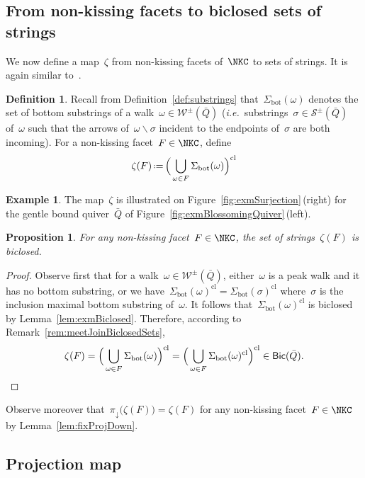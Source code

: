 \documentclass{amsart}
\newtheorem{proposition}[theorem]{Proposition}
\theoremstyle{definition}
\newtheorem{definition}[theorem]{Definition}
\newtheorem{example}[theorem]{Example}
\newcommand{\ssm}{\smallsetminus} %
\newcommand{\eqdef}{\mbox{\,\raisebox{0.2ex}{\scriptsize\ensuremath{\mathrm:}}\ensuremath{=}\,}} %
\newcommand{\fref}[1]{Figure~\ref{#1}} %
\newcommand{\ie}{\textit{i.e.}~} %
\newcommand{\strings}{\mathcal{S}} %
\newcommand{\walks}{\mathcal{W}} %
\newcommand{\bottom}{\mathrm{bot}} %
\newcommand{\closure}[1]{#1^{\mathrm{cl}}} %
\newcommand{\Bicl}[1]{\mathsf{Bic}(#1)} %
\newcommand{\projDown}{\pi_\downarrow} %
\begin{document}
\subsection{From non-kissing facets to biclosed sets of strings}

We now define a map~$\zeta$ from non-kissing facets of~$\NKC$ to sets of strings.
It is again similar to~\cite[Sect.~8]{McConville}.

\begin{definition}
\label{def:zeta}
Recall from Definition~\ref{def:substrings} that~$\Sigma_\bottom(\omega)$ denotes the set of bottom substrings of a walk~$\omega \in \walks^\pm(\bar Q)$ (\ie substrings~$\sigma \in \strings^\pm(\bar Q)$ of~$\omega$ such that the arrows of~$\omega \ssm \sigma$ incident to the endpoints of~$\sigma$ are both incoming).
For a non-kissing facet~$F \in \NKC$, define
\[
\zeta(F) \eqdef \closure{\Big( \bigcup_{\omega \in F} \Sigma_\bottom(\omega) \Big)}
\]
\end{definition}

\begin{example}
The map~$\zeta$ is illustrated on \fref{fig:exmSurjection}\,(right)  for the gentle bound quiver~$\bar Q$ of \fref{fig:exmBlossomingQuiver}\,(left).
\end{example}

\begin{proposition}
For any non-kissing facet~$F \in \NKC$, the set of strings~$\zeta(F)$ is biclosed.
\end{proposition}

\begin{proof}
Observe first that for a walk~$\omega \in \walks^\pm(\bar Q)$, either~$\omega$ is a peak walk and it has no bottom substring, or we have~$\closure{\Sigma_\bottom(\omega)} = \closure{\Sigma_\bottom(\sigma)}$ where~$\sigma$ is the inclusion maximal bottom substring of~$\omega$.
It follows that~$\closure{\Sigma_\bottom(\omega)}$ is biclosed by Lemma~\ref{lem:exmBiclosed}.
Therefore, according to Remark~\ref{rem:meetJoinBiclosedSets},
\[
\zeta(F) = \closure{\Big( \bigcup_{\omega \in F} \Sigma_\bottom(\omega) \Big)} = \closure{\Big( \bigcup_{\omega \in F} \closure{\Sigma_\bottom(\omega)} \Big)} \in \Bicl{\bar Q}. \qedhere
\]
\end{proof}

Observe moreover that~$\projDown \big( \zeta(F) \big) = \zeta(F)$ for any non-kissing facet~$F \in \NKC$ by Lemma~\ref{lem:fixProjDown}.

\subsection{Projection map}
\end{document}
